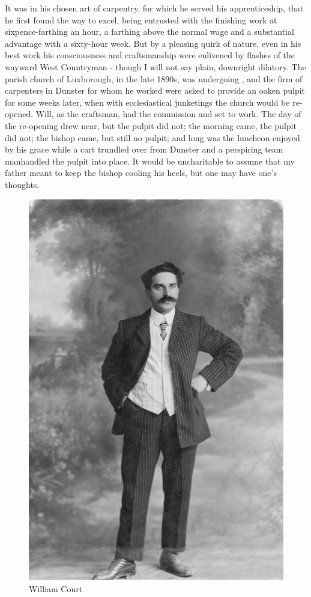 It was in his chosen art of carpentry, for which he served his apprenticeship, that he first found the way to excel, being entrusted with the finishing work at sixpence-farthing an hour, a farthing above the normal wage and a substantial advantage with a sixty-hour week. But by a pleasing quirk of nature, even in his best work his consciousness and craftsmanship were enlivened by flashes of the wayward West Countryman - though I will not say plain, downright dilatory. The parish church of Luxborough, in the late 1890s, was undergoing , and the firm of carpenters in Dunster for whom he worked were asked to provide an oaken pulpit for some weeks later, when with ecclesiastical junketings the church would be re-opened. Will, as the craftsman, had the commission and set to work. The day of the re-opening drew near, but the pulpit did not; the morning came, the pulpit did not; the bishop came, but still no pulpit; and long was the luncheon enjoyed by his grace while a cart trundled over from Dunster and a perspiring team manhandled the pulpit into place. It would be uncharitable to assume that my father meant to keep the bishop cooling his heels, but one may have one’s thoughts.

\begin{figure}
	\centering
     \includegraphics[width=1\textwidth]{figures/WilliamCourt}
     \caption{William Court}
     \label{fig:WilliamCourt}
\end{figure}

